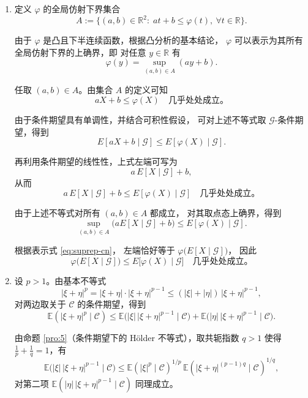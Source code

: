 \documentclass{ctexart}
\begin{document}
\begin{solution}
  \begin{enumerate}
    \item 定义 $\varphi$ 的全局仿射下界集合
      \[
        A
        :=
        \bigl\{(a,b)\in\mathbb R^2:
          \; at+b\le \varphi(t),\ \forall t\in\mathbb R
        \bigr\}.
      \]

      由于 $\varphi$ 是凸且下半连续函数，根据凸分析的基本结论，
      $\varphi$ 可以表示为其所有全局仿射下界的上确界，即
      对任意 $y\in\mathbb R$ 有
      \begin{equation}\label{eq:suprep-cn}
        \varphi(y)
        =
        \sup_{(a,b)\in A}(ay+b).
      \end{equation}

      任取 $(a,b)\in A$。由集合 $A$ 的定义可知
      \[
        aX+b\le \varphi(X)
        \quad \text{几乎处处成立。}
      \]

      由于条件期望具有单调性，并结合可积性假设，
      可对上述不等式取 $\mathcal G$-条件期望，得到
      \[
        E[aX+b\mid\mathcal G]
        \le
        E[\varphi(X)\mid\mathcal G].
      \]

      再利用条件期望的线性性，上式左端可写为
      \[
        a\,E[X\mid\mathcal G]+b,
      \]
      从而
      \[
        a\,E[X\mid\mathcal G]+b
        \le
        E[\varphi(X)\mid\mathcal G]
        \quad \text{几乎处处成立。}
      \]

      由于上述不等式对所有 $(a,b)\in A$ 都成立，
      对其取点态上确界，得到
      \[
        \sup_{(a,b)\in A}
        \bigl(aE[X\mid\mathcal G]+b\bigr)
        \le
        E[\varphi(X)\mid\mathcal G].
      \]

      根据表示式 \eqref{eq:suprep-cn}，
      左端恰好等于
      $\varphi\bigl(E[X\mid\mathcal G]\bigr)$，
      因此
      \[
        \varphi\bigl(E[X\mid\mathcal G]\bigr)
        \le
        E\bigl[\varphi(X)\mid\mathcal G\bigr]
        \quad \text{几乎处处成立。}
      \]
    \item
      设 $p>1$。由基本不等式
      \[
        |\xi+\eta|^p
        =
        |\xi+\eta|\cdot|\xi+\eta|^{p-1}
        \le (|\xi|+|\eta|)\,|\xi+\eta|^{p-1},
      \]
      对两边取关于 $\mathcal C$ 的条件期望，得到
      \[
        \mathbb E(|\xi+\eta|^p\mid\mathcal C)
        \le
        \mathbb E\bigl(|\xi|\,|\xi+\eta|^{p-1}\mid\mathcal C\bigr)
        +
        \mathbb E\bigl(|\eta|\,|\xi+\eta|^{p-1}\mid\mathcal C\bigr).
      \]

      由命题 \ref{pro:5}（条件期望下的 Hölder 不等式），取共轭指数
      $q>1$ 使得 $\frac1p+\frac1q=1$，有
      \[
        \mathbb E\bigl(|\xi|\,|\xi+\eta|^{p-1}\mid\mathcal C\bigr)
        \le
        \mathbb E(|\xi|^p\mid\mathcal C)^{1/p}
        \,
        \mathbb E(|\xi+\eta|^{(p-1)q}\mid\mathcal C)^{1/q},
      \]
      对第二项
      $\mathbb E(|\eta|\,|\xi+\eta|^{p-1}\mid\mathcal C)$
      同理成立。


\end{enumerate}
\end{solution}
\end{document}
